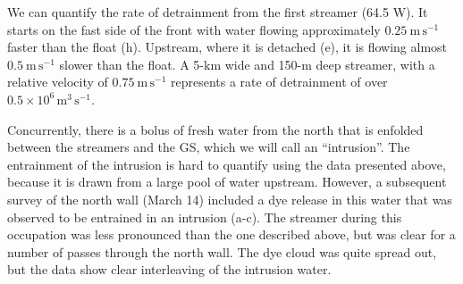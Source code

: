 \documentclass{article}
\begin{document}
We can quantify the rate of detrainment from the first streamer (64.5 W). It starts on the fast side of the front with water flowing approximately $0.25\ \mathrm{m\,s^{-1}}$ faster than the float (h). Upstream, where it is detached (e), it is flowing almost $0.5\ \mathrm{m\,s^{-1}}$ slower than the float.  A 5-km wide and 150-m deep streamer,  with a relative velocity of $0.75\ \mathrm{m\,s^{-1}}$ represents a rate of detrainment of over $0.5\times10^{6}\, \mathrm{m^{3}\,s^{-1}}$.  


Concurrently, there is a bolus of fresh water from the north that is enfolded between the streamers and the GS, which we will call an ``intrusion''. The entrainment of the intrusion is hard to quantify using the data presented above, because it is drawn from a large pool of water upstream.  However, a subsequent survey of the north wall (March 14) included a dye release in this water that was observed to be entrained in an intrusion (a-c). The streamer during this occupation was less pronounced than the one described above, but was clear for a number of passes through the north wall.  The dye cloud was quite spread out, but the data show clear interleaving of the intrusion water.  
\end{document}
